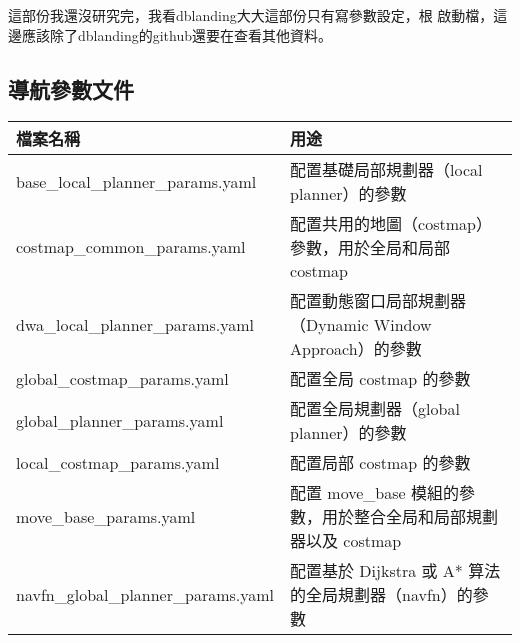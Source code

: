 這部份我還沒研究完，我看dblanding大大這部份只有寫參數設定，根
啟動檔，這邊應該除了dblanding的github還要在查看其他資料。
\subsection{導航參數文件}
\begin{table}[ht]
\centering
\begin{tabularx}{\textwidth}{|l|X|}
\hline
\textbf{檔案名稱}                     & \textbf{用途}                                                   \\ \hline
base\_local\_planner\_params.yaml  & 配置基礎局部規劃器（local planner）的參數                         \\ \hline
costmap\_common\_params.yaml       & 配置共用的地圖（costmap）參數，用於全局和局部 costmap             \\ \hline
dwa\_local\_planner\_params.yaml   & 配置動態窗口局部規劃器（Dynamic Window Approach）的參數         \\ \hline
global\_costmap\_params.yaml       & 配置全局 costmap 的參數                                         \\ \hline
global\_planner\_params.yaml       & 配置全局規劃器（global planner）的參數                           \\ \hline
local\_costmap\_params.yaml        & 配置局部 costmap 的參數                                         \\ \hline
move\_base\_params.yaml            & 配置 move\_base 模組的參數，用於整合全局和局部規劃器以及 costmap \\ \hline
navfn\_global\_planner\_params.yaml& 配置基於 Dijkstra 或 A* 算法的全局規劃器（navfn）的參數          \\ \hline
\end{tabularx}
\end{table}


